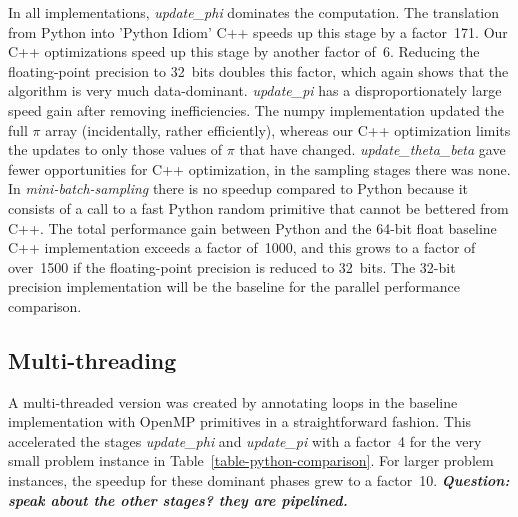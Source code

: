 In all implementations, \textit{update\_phi} dominates the computation.
The translation from Python into 'Python Idiom' C++ speeds up this stage
by a factor~171. %
Our C++ optimizations speed up this stage
by another factor of~6. Reducing the floating-point precision to 32~bits
doubles this factor, which again shows that the algorithm is very much data-dominant.
%
\textit{update\_pi} has a disproportionately large speed
gain after removing inefficiencies. The numpy implementation updated the full
$\pi$ array (incidentally, rather efficiently), whereas our C++ optimization
limits the updates to only those values of $\pi$ that have changed.
%
\textit{update\_theta\_beta} gave fewer opportunities for C++ optimization,
in the sampling stages there was none. In \textit{mini-batch-sampling} there
is no speedup compared to Python because it consists of a call to
a fast Python random primitive that cannot be bettered from C++.
The total performance gain between Python and the 64-bit float baseline C++
implementation exceeds a factor of~1000, and this grows to a factor of over~1500
if the floating-point precision is reduced to 32~bits. The 32-bit precision
implementation will be the baseline for the parallel performance comparison.

\subsection{Multi-threading}

A multi-threaded version was created by annotating loops in the
baseline implementation with OpenMP primitives in a straightforward
fashion. This accelerated the stages \textit{update\_phi} and
\textit{update\_pi} with a factor~4 for the very small problem instance
in Table~\ref{table-python-comparison}. For larger problem instances, the
speedup for these dominant phases grew to a factor~10.
\textbf{\emph{Question: speak about the other stages? they are pipelined.}}

\begin{comment}
The introduction of a custom user-space random generator brings at most
a very small
benefit. We show it, because it is necessary for the multi-threaded
implementations described in the next section, and this measurement serves to
prove that it does not harm execution speed.
\end{comment}
